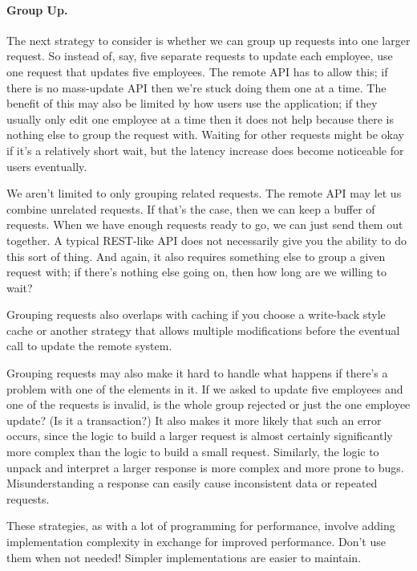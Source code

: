 \paragraph{Group Up.}
The next strategy to consider is whether we can group up requests into one larger request. So instead of, say, five separate requests to update each employee, use one request that updates five employees. The remote API has to allow this; if there is no mass-update API then we're stuck doing them one at a time. The benefit of this may also be limited by how users use the application; if they usually only edit one employee at a time then it does not help because there is nothing else to group the request with. Waiting for other requests might be okay if it's a relatively short wait, but the latency increase does become noticeable for users eventually.

We aren't limited to only grouping related requests. The remote API may let us combine unrelated requests. If that's the case, then we can keep a buffer of requests. When we have enough requests ready to go, we can just send them out together. A typical REST-like API does not necessarily give you the ability to do this sort of thing. And again, it also requires something else to group a given request with; if there's nothing else going on, then how long are we willing to wait?

Grouping requests also overlaps with caching if you choose a write-back style cache or another strategy that allows multiple modifications before the eventual call to update the remote system. 

Grouping requests may also make it hard to handle what happens if there's a problem with one of the elements in it. If we asked to update five employees and one of the requests is invalid, is the whole group rejected or just the one employee update? (Is it a transaction?) It also makes it more likely that such an error occurs, since the logic to build a larger request is almost certainly significantly more complex than the logic to build a small request. Similarly, the logic to unpack and interpret a larger response is more complex and more prone to bugs. Misunderstanding a response can easily cause inconsistent data or repeated requests.

These strategies, as with a lot of programming for performance, involve adding implementation complexity in exchange for improved performance. Don't use them when not needed! Simpler implementations are easier to maintain.


